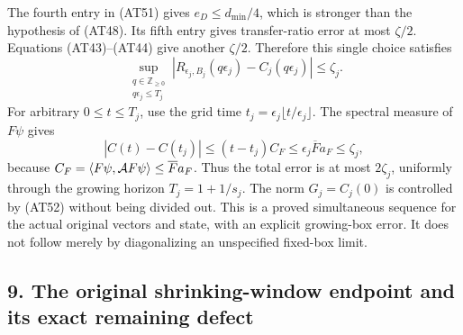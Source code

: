 \documentclass[11pt]{article}
\begin{document}
The fourth entry in (AT51) gives \(e_D\le d_{\min}/4\), which is stronger than the hypothesis of (AT48). Its fifth entry gives transfer-ratio error at most \(\zeta/2\). Equations (AT43)–(AT44) give another \(\zeta/2\). Therefore this single choice satisfies
\[
 \sup_{\substack{q\in\mathbb Z_{\ge0}\\q\epsilon_j\le T_j}}
 \left|R_{\epsilon_j,B_j}(q\epsilon_j)-C_j(q\epsilon_j)\right|
 \le\zeta_j .
 \tag{AT52}
\]
For arbitrary \(0\le t\le T_j\), use the grid time
\(t_j=\epsilon_j\lfloor t/\epsilon_j\rfloor\).
The spectral measure of \(F\psi\) gives
\[
 |C(t)-C(t_j)|\le(t-t_j)C_F
       \le\epsilon_j\overline F a_F\le\zeta_j,
 \tag{AT53}
\]
because \(C_F=\langle F\psi,{\cal A}F\psi\rangle
\le\overline F a_F\).
Thus the total error is at most \(2\zeta_j\), uniformly through the growing horizon \(T_j=1+1/s_j\).
The norm \(G_j=C_j(0)\) is controlled by (AT52) without being divided out.
This is a proved simultaneous sequence for the actual original vectors and state, with an explicit growing-box error. It does not follow merely by diagonalizing an unspecified fixed-box limit.

\subsection*{9. The original shrinking-window endpoint and its exact remaining defect}
\end{document}
